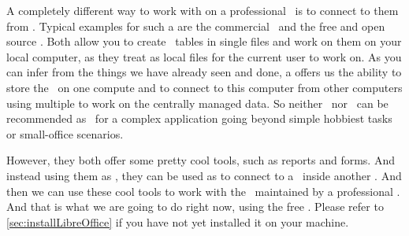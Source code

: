 %
%
\label{sec:accessingDbFromLibreOfficeBase}%
%
A completely different way to work with  on a professional \dbms\ is to connect to them from .
Typical examples for such a  are the commercial \microsoftAccess\ and the free and open source \libreofficeBase.
Both allow you to create \db\ tables in single files and work on them on your local computer, as they treat  as local files for the current user to work on.
As you can infer from the things we have already seen and done, a  offers us the ability to store the \db\ on one compute and to connect to this computer from other computers using multiple  to work on the centrally managed data.
So neither \microsoftAccess\ nor \libreofficeBase\ can be recommended as \dbms\ for a complex application going beyond simple hobbiest tasks or small-office scenarios.

However, they both offer some pretty cool tools, such as reports and forms.
And instead using them as \dbms, they can be used as  to connect to a \db\ inside another \dbms.
And then we can use these cool tools to work with the \db\ maintained by a professional \dbms.
And that is what we are going to do right now, using the free \libreofficeBase.
Please refer to \cref{sec:installLibreOffice} if you have not yet installed it on your machine.%
%
\FloatBarrier%
%
%
%
%
%
%
%
%
\FloatBarrier%
\endhsection%
%
